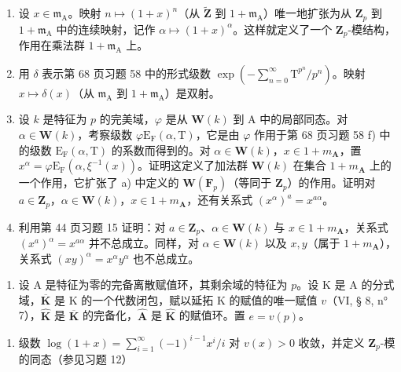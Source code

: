 \begin{enumerate}
\def\labelenumi{\alph{enumi})}
\item
  设 \(x \in \mathfrak{m}_{\mathrm{A}}\)。映射 \(n \mapsto (1 + x)^n\)（从 \(\tilde{\mathbf{Z}}\) 到 \(1 + \mathfrak{m}_{\mathrm{A}}\)）唯一地扩张为从 \(\mathbf{Z}_p\) 到 \(1 + \mathfrak{m}_{\mathrm{A}}\) 中的连续映射，记作 \(\alpha \mapsto (1 + x)^{\alpha}\)。这样就定义了一个 \(\mathbf{Z}_p\)-模结构，作用在乘法群 \(1 + \mathfrak{m}_{\mathrm{A}}\) 上。
\item
  用 \(\delta\) 表示第 68 页习题 58 中的形式级数 \(\exp\left(-\sum_{n=0}^{\infty}\mathrm{T}^{p^n}/p^n\right)\)。映射 \(x \mapsto \delta(x)\)（从 \(\mathfrak{m}_{\mathrm{A}}\) 到 \(1 + \mathfrak{m}_{\mathrm{A}}\)）是双射。
\item
  设 \(k\) 是特征为 \(p\) 的完美域，\(\varphi\) 是从 \(\mathbf{W}(k)\) 到 A 中的局部同态。对 \(\alpha \in \mathbf{W}(k)\)，考察级数 \(\varphi \mathrm{E}_{\mathrm{F}}(\alpha, \mathrm{T})\)，它是由 \(\varphi\) 作用于第 68 页习题 58 f) 中的级数 \(\mathrm{E}_{\mathrm{F}}(\alpha, \mathrm{T})\) 的系数而得到的。对 \(\alpha \in \mathbf{W}(k)\)，\(x \in 1 + m_{\mathbf{A}}\)，置 \(x^{\alpha} = \varphi \mathrm{E}_{\mathrm{F}}(\alpha, \xi^{-1}(x))\)。证明这定义了加法群 \(\mathbf{W}(k)\) 在集合 \(1 + m_{\mathbf{A}}\) 上的一个作用，它扩张了 a) 中定义的 \(\mathbf{W}(\mathbf{F}_p)\)（等同于 \(\mathbf{Z}_p\)）的作用。证明对 \(a \in \mathbf{Z}_p\)，\(\alpha \in \mathbf{W}(k)\)，\(x \in 1 + m_{\mathbf{A}}\)，还有关系式 \((x^{\alpha})^{a} = x^{a\alpha}\)。
\item
  利用第 44 页习题 15 证明：对 \(a \in \mathbf{Z}_{p}\)、\(\alpha \in \mathbf{W}(k)\) 与 \(x \in 1 + m_{\mathbf{A}}\)，关系式 \((x^{a})^{\alpha} = x^{a\alpha}\) 并不总成立。同样，对 \(\alpha \in \mathbf{W}(k)\) 以及 \(x, y\)（属于 \(1 + m_{\mathbf{A}}\)），关系式 \((xy)^{\alpha} = x^{\alpha}y^{\alpha}\) 也不总成立。
\end{enumerate}

\begin{enumerate}
\def\labelenumi{\arabic{enumi})}
\setcounter{enumi}{12}
\tightlist
\item
  设 A 是特征为零的完备离散赋值环，其剩余域的特征为 \(p\)。设 K 是 A 的分式域，\(\overline{\mathbf{K}}\) 是 K 的一个代数闭包，赋以延拓 K 的赋值的唯一赋值 \(v\)（VI, § 8, n° 7），\(\hat{\mathbf{K}}\) 是 \(\overline{\mathbf{K}}\) 的完备化，\(\hat{\mathbf{A}}\) 是 \(\hat{\mathbf{K}}\) 的赋值环。置 \(e = v(p)\)。
\end{enumerate}

\begin{enumerate}
\def\labelenumi{\alph{enumi})}
\tightlist
\item
  级数 \(\log(1 + x) = \sum_{i=1}^{\infty} (-1)^{i-1} x^i / i\) 对 \(v(x) > 0\) 收敛，并定义 \(\mathbf{Z}_p\)-模的同态（参见习题 12）
\end{enumerate}

